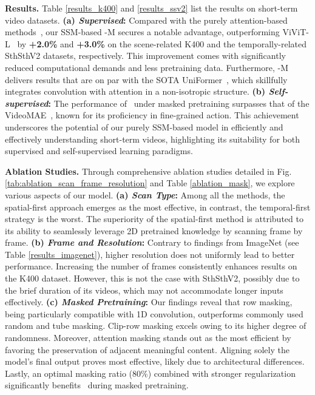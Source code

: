 \vspace{0.05cm}
\noindent\textbf{Results.}
Table \ref{results_k400} and \ref{results_ssv2} list the results on short-term video datasets.
\textbf{(a) \textit{Supervised}:}
Compared with the purely attention-based methods~\cite{timesformer,vivit},
our SSM-based \ModelName-M secures a notable advantage, 
outperforming ViViT-L~\cite{vivit} by \textbf{+2.0\%} and \textbf{+3.0\%} on the scene-related K400 and the temporally-related SthSthV2 datasets, respectively. 
This improvement comes with significantly reduced computational demands and less pretraining data.
Furthermore, 
\ModelName-M delivers results that are on par with the SOTA UniFormer~\cite{uniformer}, 
which skillfully integrates convolution with attention in a non-isotropic structure.
\textbf{(b) \textit{Self-supervised}:}
The performance of \ModelName\  under masked pretraining surpasses that of the VideoMAE~\cite{videomae}, 
known for its proficiency in fine-grained action. This achievement underscores the potential of our purely SSM-based model in efficiently and effectively understanding short-term videos, highlighting its suitability for both supervised and self-supervised learning paradigms.


\vspace{0.05cm}
\noindent\textbf{Ablation Studies.} 
Through comprehensive ablation studies detailed in Fig. \ref{tab:ablation_scan_frame_resolution} and Table \ref{ablation_mask}, 
we explore various aspects of our model.
\textbf{(a) \textit{Scan Type}:}
Among all the methods,
the spatial-first approach emerges as the most effective, 
in contrast, 
the temporal-first strategy is the worst. 
The superiority of the spatial-first method is attributed to its ability to seamlessly leverage 2D pretrained knowledge by scanning frame by frame.
\textbf{(b) \textit{Frame and Resolution}:}
Contrary to findings from ImageNet (see Table \ref{results_imagenet}), 
higher resolution does not uniformly lead to better performance. 
Increasing the number of frames consistently enhances results on the K400 dataset. 
However, 
this is not the case with SthSthV2, 
possibly due to the brief duration of its videos, which may not accommodate longer inputs effectively.
\textbf{(c) \textit{Masked Pretraining}:}
Our findings reveal that row masking, 
being particularly compatible with 1D convolution, outperforms commonly used random and tube masking. 
Clip-row masking excels owing to its higher degree of randomness. 
Moreover, 
attention masking stands out as the most efficient by favoring the preservation of adjacent meaningful content. 
Aligning solely the model's final output proves most effective, 
likely due to architectural differences. 
Lastly, an optimal masking ratio (80\%) combined with stronger regularization significantly benefits \ModelName\  during masked pretraining.


